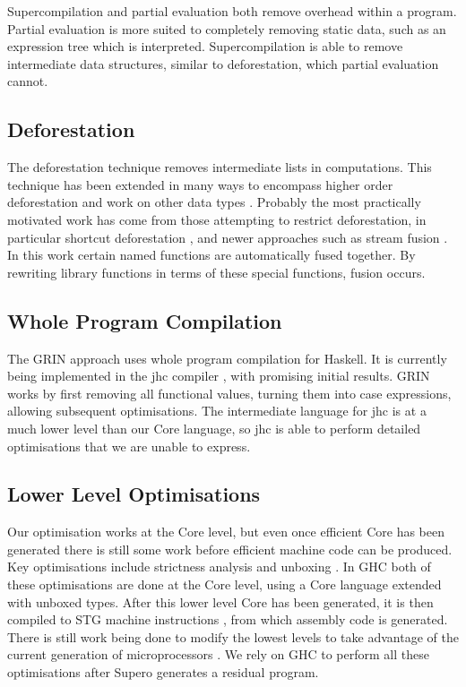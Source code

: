 Supercompilation and partial evaluation both remove overhead within a program. Partial evaluation is more suited to completely removing static data, such as an expression tree which is interpreted. Supercompilation is able to remove intermediate data structures, similar to deforestation, which partial evaluation cannot.


\subsection{Deforestation}

The deforestation technique \cite{wadler:deforestation} removes intermediate lists in computations. This technique has been extended in many ways to encompass higher order deforestation \cite{marlow:higher_order_deforestation} and work on other data types \cite{coutts:string_fusion}. Probably the most practically motivated work has come from those attempting to restrict deforestation, in particular shortcut deforestation \cite{gill:shortcut_deforestation}, and newer approaches such as stream fusion \cite{coutts:stream_fusion}. In this work certain named functions are automatically fused together. By rewriting library functions in terms of these special functions, fusion occurs.

\subsection{Whole Program Compilation}

The GRIN approach \cite{grin} uses whole program compilation for Haskell. It is currently being implemented in the jhc compiler \cite{jhc}, with promising initial results. GRIN works by first removing all functional values, turning them into case expressions, allowing subsequent optimisations. The intermediate language for jhc is at a much lower level than our Core language, so jhc is able to perform detailed optimisations that we are unable to express.

\subsection{Lower Level Optimisations}

Our optimisation works at the Core level, but even once efficient Core has been generated there is still some work before efficient machine code can be produced. Key optimisations include strictness analysis and unboxing \cite{spj:unboxing}. In GHC both of these optimisations are done at the Core level, using a Core language extended with unboxed types. After this lower level Core has been generated, it is then compiled to STG machine instructions \cite{spj:stg}, from which assembly code is generated. There is still work being done to modify the lowest levels to take advantage of the current generation of microprocessors \cite{marlow:pointer_tagging}. We rely on GHC to perform all these optimisations after Supero generates a residual program.

